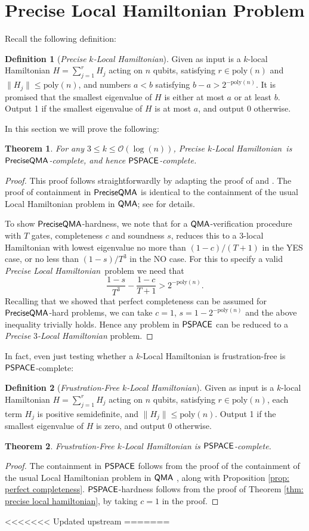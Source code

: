 \documentclass[11pt]{article}
\newtheorem{theorem}{Theorem}
\theoremstyle{definition}
\theoremstyle{remark}
\theoremstyle{definition}
\newtheorem{definition}{Definition}
\newcommand\QMA{{\sf{QMA}}}
\newcommand\PSPACE{{\sf{PSPACE}}}
\newcommand\QMAexp{{\sf{PreciseQMA}}}
\newcommand\preciselh{\textit{Precise Local Hamiltonian}}
\newcommand\preciseklh{\textit{Precise }$k$\textit{-Local Hamiltonian}}
\newcommand\preciseilh[1]{\textit{Precise }\ensuremath{#1}\textit{-Local Hamiltonian}}
\newcommand{\poly}{\textrm{poly}}
\begin{document}
\section{Precise Local Hamiltonian Problem}\label{app:localhamiltonian}
Recall the following definition:
\begin{definition}[\preciseklh]
Given as input is a $k$-local Hamiltonian $H=\sum_{j=1}^rH_j$ acting on $n$ qubits, satisfying $r \in \poly(n)$ and $\|H_j\| \le \poly(n)$, and numbers $a < b$ satisfying $b - a > 2^{-\poly(n)}$. It is promised that the smallest eigenvalue of $H$ is either at most $a$ or at least $b$. Output 1 if the smallest eigenvalue of $H$ is at most $a$, and output 0 otherwise.
\end{definition}
In this section we will prove the following:
\begin{theorem}
For any $3 \le k \le \mathcal{O}(\log(n))$, \preciseklh \ is $\QMAexp$-complete, and hence $\PSPACE$-complete.
\end{theorem}
\begin{proof}
This proof follows straightforwardly by adapting the proof of \cite{ksv02} and \cite{kr03}. The proof of containment in $\QMAexp$ is identical to the containment of the usual Local Hamiltonian problem in $\QMA$; see \cite{ksv02} for details.

To show $\QMAexp$-hardness, we note that for a $\QMA$-verification procedure with $T$ gates, completeness $c$ and soundness $s$, \cite{kr03} reduces this to a 3-local Hamiltonian with lowest eigenvalue no more than $(1-c) / (T+1)$ in the YES case, or no less than $(1-s) / T^3$ in the NO case. For this to specify a valid \preciselh \ problem we need that
\begin{equation} \label{eq:preciselh_condition}
\frac{1-s}{T^3} - \frac{1-c}{T+1} > 2^{-\poly(n)}.
\end{equation}
Recalling that we showed that perfect completeness can be assumed for $\QMAexp$-hard problems, we can take $c=1$, $s = 1-2^{-\poly(n)}$ and the above inequality trivially holds. Hence any problem in $\PSPACE$ can be reduced to a \preciseilh{3} problem.
\end{proof}
In fact, even just testing whether a $k$-Local Hamiltonian is frustration-free is $\PSPACE$-complete: \begin{definition} [\emph{Frustration-Free $k$-Local Hamiltonian}] Given as input is a $k$-local Hamiltonian $H=\sum_{j=1}^rH_j$ acting on $n$ qubits, satisfying $r \in \poly(n)$, each term $H_j$ is positive semidefinite, and $\|H_j\| \le \poly(n)$. Output 1 if the smallest eigenvalue of $H$ is zero, and output 0 otherwise.
\end{definition}
\begin{theorem}
Frustration-Free $k$-Local Hamiltonian is $\PSPACE$-complete.
\end{theorem}
\begin{proof}
The containment in $\PSPACE$ follows from the proof of the containment of the usual Local Hamiltonian problem in $\QMA$ \cite{ksv02}, along with Proposition \ref{prop: perfect completeness}. $\PSPACE$-hardness follows from the proof of Theorem \ref{thm: precise local hamiltonian}, by taking $c=1$ in the proof.
\end{proof}
<<<<<<< Updated upstream
=======
\end{document}
